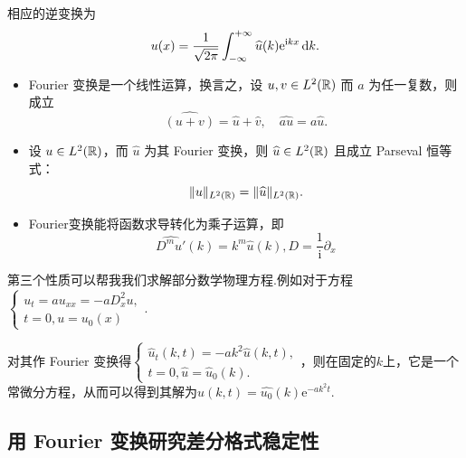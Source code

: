 相应的逆变换为
\begin{equation*}
    u(x) = \frac{1}{\sqrt{2\pi}} \int_{-\infty}^{+\infty} \widehat{u}(k) \mathrm{e}^{\mathrm{i}kx} \mathop{}\!\mathrm{d} k. 
\end{equation*}

\begin{property}
    \begin{itemize}
        \item Fourier 变换是一个线性运算，换言之，设 $u, v \in L^2(\mathbb{R})$ 而 $a$ 为任一复数，则成立
        \begin{equation}
            \widehat{(u + v)} = \widehat{u} + \widehat{v}, \quad \widehat{au} = a\widehat{u}. \label{eq:fourier_linear}
        \end{equation}
        
        \item 设 $u \in L^2(\mathbb{R})$，而 $\widehat{u}$ 为其 Fourier 变换，则 $\widehat{u} \in L^2(\mathbb{R})$ 且成立 Parseval 恒等式：
        \begin{equation}
            \|u\|_{L^2(\mathbb{R})} = \|\widehat{u}\|_{L^2(\mathbb{R})}. \label{eq:parseval}
        \end{equation}

        \item Fourier变换能将函数求导转化为乘子运算，即
        \begin{equation}
            \widehat{D^m u'}(k) = k^m \widehat{u}(k), D=\frac{1}{\mathrm{i}}\partial_x \label{eq:fourier_derivative}
        \end{equation}
    \end{itemize}
\end{property}
第三个性质可以帮我我们求解部分数学物理方程.例如对于方程$\begin{cases}
    u_t=au_{xx}=-a D_x^2 u, \\
    t=0, u=u_0(x)
\end{cases}$.\par
对其作 Fourier 变换得$\begin{cases}
    \widehat{u}_t(k,t)=-a k^2 \widehat{u}(k,t), \\
    t=0, \widehat{u}=\widehat{u}_0(k).
\end{cases}$，则在固定的$k$上，它是一个常微分方程，从而可以得到其解为$\widehat{u}(k,t)=\widehat{u_0}(k)\mathrm{e}^{-ak^2t}$.

\subsection{用 Fourier 变换研究差分格式稳定性}

